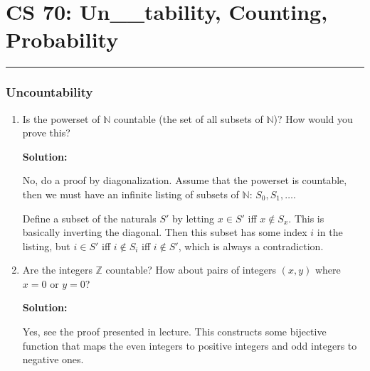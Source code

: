 \documentclass{article}
\newenvironment{solution}{

        \color{blue} \smallskip \textbf{Solution:}

    }{}
\begin{document}
\part*{CS 70: Un\_\_tability, Counting, Probability}
\vspace{-7pt}
\hrule
\vspace{7pt}

\section{Uncountability}
\begin{enumerate}
    \item Is the powerset of $\mathbb{N}$ countable (the set of all subsets of $\mathbb{N}$)? How would you prove this?
    \begin{solution}
        No, do a proof by diagonalization. Assume that the powerset is countable, then we must have an infinite listing of subsets of $\mathbb{N}$: $S_0, S_1, \ldots$.

        Define a subset of the naturals $S'$ by letting $x \in S'$ iff $x \notin S_x$. This is basically inverting the diagonal. Then this subset has some index $i$ in the listing,
        but $i \in S'$ iff $i \notin S_i$ iff $i \notin S'$, which is always a contradiction.
    \end{solution}
    \item Are the integers $\mathbb{Z}$ countable? How about pairs of integers $(x, y)$ where $x = 0$ or $y = 0$?
    \begin{solution}
        Yes, see the proof presented in lecture. This constructs some bijective function that maps the even integers to positive integers and odd
        integers to negative ones.


\end{solution}
\end{enumerate}
\end{document}
